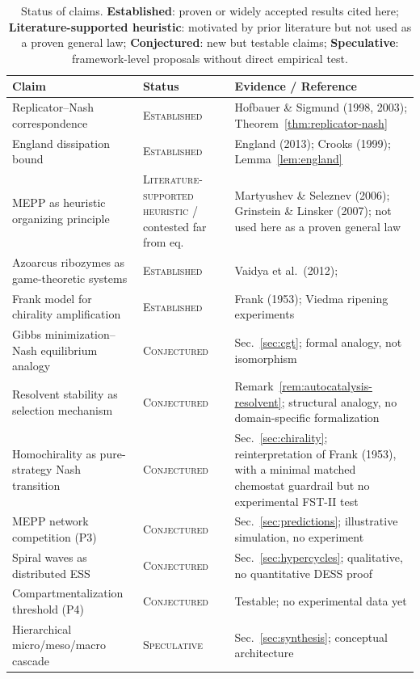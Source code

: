 \documentclass[12pt,a4paper]{article}
\theoremstyle{remark}
\begin{document}
\begin{table}[htbp]
\centering
\caption{Status of claims. \textbf{Established}: proven or widely accepted results cited here; \textbf{Literature-supported heuristic}: motivated by prior literature but not used as a proven general law; \textbf{Conjectured}: new but testable claims; \textbf{Speculative}: framework-level proposals without direct empirical test.}
\label{tab:status-claims}
\small
\setlength{\tabcolsep}{4pt}
\begin{tabularx}{\textwidth}{@{}>{\raggedright\arraybackslash}p{}>{\raggedright\arraybackslash}p{}>{\raggedright\arraybackslash}X@{}}
\toprule
\textbf{Claim} & \textbf{Status} & \textbf{Evidence / Reference} \\
\midrule
Replicator--Nash correspondence & \textsc{Established} & Hofbauer \& Sigmund (1998, 2003); Theorem~\ref{thm:replicator-nash} \\
England dissipation bound & \textsc{Established} & England (2013); Crooks (1999); Lemma~\ref{lem:england} \\
MEPP as heuristic organizing principle & \textsc{Literature-supported heuristic} / contested far from eq. & Martyushev \& Seleznev (2006); Grinstein \& Linsker (2007); not used here as a proven general law \\
Azoarcus ribozymes as game-theoretic systems & \textsc{Established} & Vaidya et al.\ (2012);~\citet{SieversKiedrowski1994} \\
Frank model for chirality amplification & \textsc{Established} & Frank (1953); Viedma ripening experiments \\
Gibbs minimization--Nash equilibrium analogy & \textsc{Conjectured} & Sec.~\ref{sec:cgt}; formal analogy, not isomorphism \\
Resolvent stability as selection mechanism & \textsc{Conjectured} & Remark~\ref{rem:autocatalysis-resolvent}; structural analogy, no domain-specific formalization \\
Homochirality as pure-strategy Nash transition & \textsc{Conjectured} & Sec.~\ref{sec:chirality}; reinterpretation of Frank (1953), with a minimal matched chemostat guardrail but no experimental FST-II test \\
MEPP network competition (P3) & \textsc{Conjectured} & Sec.~\ref{sec:predictions}; illustrative simulation, no experiment \\
Spiral waves as distributed ESS & \textsc{Conjectured} & Sec.~\ref{sec:hypercycles}; qualitative, no quantitative DESS proof \\
Compartmentalization threshold (P4) & \textsc{Conjectured} & Testable; no experimental data yet \\
Hierarchical micro/meso/macro cascade & \textsc{Speculative} & Sec.~\ref{sec:synthesis}; conceptual architecture \\
\bottomrule
\end{tabularx}
\end{table}
\end{document}
